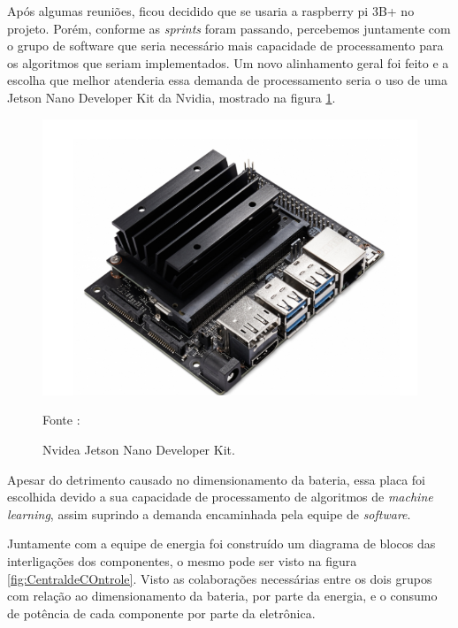 Após algumas reuniões, ficou decidido que se usaria a raspberry pi 3B+ no projeto. Porém, conforme as  \textit{sprints} foram passando, percebemos juntamente com o grupo de software que seria necessário mais capacidade de processamento para os algoritmos que seriam implementados. Um novo alinhamento geral foi feito e a escolha que melhor atenderia essa demanda de processamento seria o uso de uma Jetson Nano Developer Kit da Nvidia, mostrado na figura \ref{fig:Nvidea}. 

\begin{figure}[H]
  \centering
  \includegraphics[scale=0.5]{figuras/NvideaPI2.png}
  \caption{Nvidea Jetson Nano Developer Kit. } 
  {\footnotesize Fonte : \cite{Nvidia_Nano} } 
  \label{fig:Nvidea}
\end{figure}

Apesar do detrimento causado no dimensionamento da bateria, essa placa foi escolhida devido a sua capacidade de processamento de algoritmos de  \textit{machine learning}, assim suprindo a demanda encaminhada pela equipe de \textit{software}.

Juntamente com a equipe de energia foi construído um diagrama de blocos das interligações dos componentes, o mesmo pode ser visto  na figura \ref{fig:CentraldeCOntrole}. Visto as colaborações necessárias entre os dois grupos com relação ao dimensionamento da bateria, por parte da energia, e o consumo de potência de cada componente por parte da eletrônica. 


